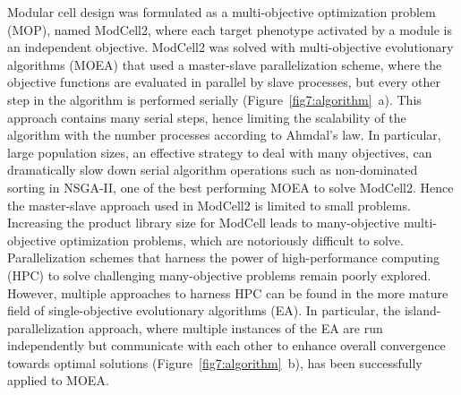 Modular cell design was formulated as a multi-objective optimization problem (MOP), named ModCell2, where each target phenotype activated by a module is an independent objective.\citep{garcia2019}
ModCell2 was solved with multi-objective evolutionary algorithms (MOEA) that used a master-slave parallelization scheme, where the objective functions are evaluated in parallel by slave processes, but every other step in the algorithm is performed serially (Figure~\ref{fig7:algorithm}~a).\citep{garcia2019, garcia2019c}
This approach contains many serial steps, hence limiting the scalability of the algorithm with the number processes according to Ahmdal's law.\citep{hill2008}
In particular, large population sizes, an effective strategy to deal with many objectives,\citep{garcia2019c,ishibuchi2009} can dramatically slow down serial algorithm operations such as non-dominated sorting in NSGA-II, \citep{deb2002} one of the best performing MOEA to solve ModCell2.\citep{garcia2019c}
Hence the master-slave approach used in ModCell2 is limited to small problems.
Increasing the product library size for ModCell leads to many-objective multi-objective optimization problems, which are notoriously difficult to solve.\citep{ishibuchi2008, li2018}
Parallelization schemes that harness the power of high-performance computing (HPC) to solve challenging many-objective problems remain poorly explored.
However, multiple approaches to harness HPC can be found in the more mature field of single-objective evolutionary algorithms (EA). \citep{alba2013}
In particular, the island-parallelization approach, where multiple instances of the EA are run independently but communicate with each other to enhance overall convergence towards optimal solutions (Figure~\ref{fig7:algorithm}~b), has been successfully applied to MOEA.\citep{martens2013, jozefowiez2005, garcia2016}



%

%

